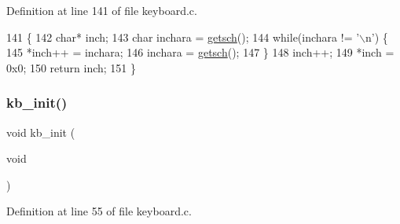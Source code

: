 Definition at line 141 of file keyboard.\+c.


\begin{DoxyCode}
141               \{
142     \textcolor{keywordtype}{char}* inch;
143     \textcolor{keywordtype}{char} inchara = \hyperlink{a00038_aa7ee03b27a489828ce588d0fc023cab3_aa7ee03b27a489828ce588d0fc023cab3}{getsch}();
144     \textcolor{keywordflow}{while}(inchara != \textcolor{charliteral}{'\(\backslash\)n'}) \{
145         *inch++ = inchara;
146         inchara = \hyperlink{a00038_aa7ee03b27a489828ce588d0fc023cab3_aa7ee03b27a489828ce588d0fc023cab3}{getsch}();
147     \}
148     inch++;
149     *inch = 0x0;
150     \textcolor{keywordflow}{return} inch;
151 \}
\end{DoxyCode}
\mbox{\label{a00041_aabdb223e5290f3b3c07bc82d075b87d7_aabdb223e5290f3b3c07bc82d075b87d7}} 
\subsubsection{\texorpdfstring{kb\+\_\+init()}{kb\_init()}}
{\footnotesize\ttfamily void kb\+\_\+init (\begin{DoxyParamCaption}\item[{void}]{ }\end{DoxyParamCaption})}



Definition at line 55 of file keyboard.\+c.


